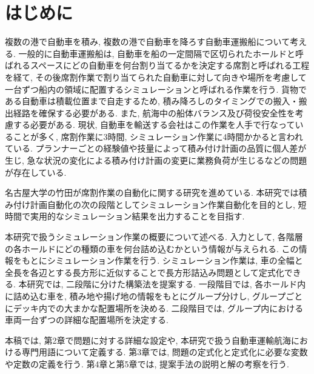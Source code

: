 \chapter{はじめに}

複数の港で自動車を積み, 複数の港で自動車を降ろす自動車運搬船について考える. 
一般的に自動車運搬船は, 自動車を船の一定間隔で区切られたホールドと呼ばれるスペースにどの自動車を何台割り当てるかを決定する席割と呼ばれる工程を経て, 
その後席割作業で割り当てられた自動車に対して向きや場所を考慮して一台ずつ船内の領域に配置するシミュレーションと呼ばれる作業を行う. 
貨物である自動車は積載位置まで自走するため, 積み降ろしのタイミングでの搬入・搬出経路を確保する必要がある. 
また, 航海中の船体バランス及び荷役安全性を考慮する必要がある. 
現状, 自動車を輸送する会社はこの作業を人手で行なっていることが多く, 席割作業に3時間, シミュレーション作業に4時間かかると言われている\cite{mitsui}. 
プランナーごとの経験値や技量によって積み付け計画の品質に個人差が生じ, 急な状況の変化による積み付け計画の変更に業務負荷が生じるなどの問題が存在している. 

名古屋大学の竹田が席割作業の自動化に関する研究を進めている\cite{takeda}. 
本研究では積み付け計画自動化の次の段階としてシミュレーション作業自動化を目的とし, 短時間で実用的なシミュレーション結果を出力することを目指す.  

本研究で扱うシミュレーション作業の概要について述べる. 
入力として, 各階層の各ホールドにどの種類の車を何台詰め込むかという情報が与えられる. 
この情報をもとにシミュレーション作業を行う. 
シミュレーション作業は, 車の全幅と全長を各辺とする長方形に近似することで長方形詰込み問題として定式化できる. 
本研究では, 二段階に分けた構築法を提案する. 
一段階目では, 各ホールド内に詰め込む車を, 積み地や揚げ地の情報をもとにグループ分けし, グループごとにデッキ内での大まかな配置場所を決める. 
二段階目では, グループ内における車両一台ずつの詳細な配置場所を決定する. 

本稿では, 第2章で問題に対する詳細な設定や, 本研究で扱う自動車運輸航海における専門用語について定義する. 
第3章では, 問題の定式化と定式化に必要な変数や定数の定義を行う. 
第4章と第5章では, 提案手法の説明と解の考察を行う. 
